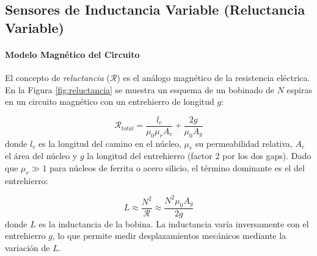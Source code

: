 \subsection{Sensores de Inductancia Variable (Reluctancia Variable)}\label{sub:reluctancia}

\paragraph{Modelo Magnético del Circuito}

El concepto de \emph{reluctancia} ($\mathcal{R}$) es el análogo magnético de la resistencia eléctrica. En la Figura \ref{fig:reluctancia} se muestra un esquema de un bobinado de $N$ espiras en un circuito magnético con un entrehierro de longitud $g$:

\begin{equation}\label{eq:reluctancia}
  \mathcal{R}_{total} = \frac{l_c}{\mu_0 \mu_r A_c} + \frac{2g}{\mu_0 A_g}
\end{equation}
%
donde $l_c$ es la longitud del camino en el núcleo, $\mu_r$ su permeabilidad relativa, $A_c$ el área del núcleo y $g$ la longitud del entrehierro (factor 2 por los dos gaps). Dado que $\mu_r \gg 1$ para núcleos de ferrita o acero silicio, el término dominante es el del entrehierro:

\begin{equation}\label{eq:L_vs_g}
  L \approx \frac{N^2}{\mathcal{R}} \approx \frac{N^2 \mu_0 A_g}{2g}
\end{equation}
%
donde $L$ es la inductancia de la bobina. La inductancia varía inversamente con el entrehierro $g$, lo que permite medir desplazamientos mecánicos mediante la variación de $L$.


